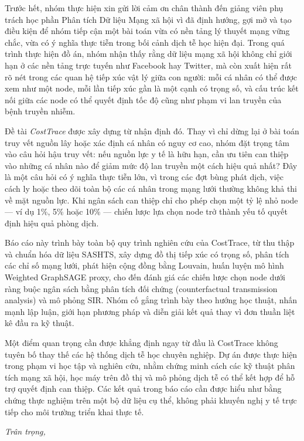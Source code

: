 \documentclass[12pt,a4paper]{report}
\theoremstyle{definition}
\begin{document}
Trước hết, nhóm thực hiện xin gửi lời cảm ơn chân thành đến giảng viên phụ trách học phần Phân tích Dữ liệu Mạng xã hội vì đã định hướng, gợi mở và tạo điều kiện để nhóm tiếp cận một bài toán vừa có nền tảng lý thuyết mạng vững chắc, vừa có ý nghĩa thực tiễn trong bối cảnh dịch tễ học hiện đại. Trong quá trình thực hiện đồ án, nhóm nhận thấy rằng dữ liệu mạng xã hội không chỉ giới hạn ở các nền tảng trực tuyến như Facebook hay Twitter, mà còn xuất hiện rất rõ nét trong các quan hệ tiếp xúc vật lý giữa con người: mỗi cá nhân có thể được xem như một node, mỗi lần tiếp xúc gần là một cạnh có trọng số, và cấu trúc kết nối giữa các node có thể quyết định tốc độ cũng như phạm vi lan truyền của bệnh truyền nhiễm.

Đề tài \textit{CostTrace} được xây dựng từ nhận định đó. Thay vì chỉ dừng lại ở bài toán truy vết nguồn lây hoặc xác định cá nhân có nguy cơ cao, nhóm đặt trọng tâm vào câu hỏi hậu truy vết: nếu nguồn lực y tế là hữu hạn, cần ưu tiên can thiệp vào những cá nhân nào để giảm mức độ lan truyền một cách hiệu quả nhất? Đây là một câu hỏi có ý nghĩa thực tiễn lớn, vì trong các đợt bùng phát dịch, việc cách ly hoặc theo dõi toàn bộ các cá nhân trong mạng lưới thường không khả thi về mặt nguồn lực. Khi ngân sách can thiệp chỉ cho phép chọn một tỷ lệ nhỏ node --- ví dụ 1\%, 5\% hoặc 10\% --- chiến lược lựa chọn node trở thành yếu tố quyết định hiệu quả phòng dịch.

Báo cáo này trình bày toàn bộ quy trình nghiên cứu của CostTrace, từ thu thập và chuẩn hóa dữ liệu SASHTS, xây dựng đồ thị tiếp xúc có trọng số, phân tích các chỉ số mạng lưới, phát hiện cộng đồng bằng Louvain, huấn luyện mô hình Weighted GraphSAGE proxy, cho đến đánh giá các chiến lược chọn node dưới ràng buộc ngân sách bằng phân tích đối chứng (counterfactual transmission analysis) và mô phỏng SIR. Nhóm cố gắng trình bày theo hướng học thuật, nhấn mạnh lập luận, giới hạn phương pháp và diễn giải kết quả thay vì đơn thuần liệt kê đầu ra kỹ thuật.

Một điểm quan trọng cần được khẳng định ngay từ đầu là CostTrace không tuyên bố thay thế các hệ thống dịch tễ học chuyên nghiệp. Dự án được thực hiện trong phạm vi học tập và nghiên cứu, nhằm chứng minh cách các kỹ thuật phân tích mạng xã hội, học máy trên đồ thị và mô phỏng dịch tễ có thể kết hợp để hỗ trợ quyết định can thiệp. Các kết quả trong báo cáo cần được hiểu như bằng chứng thực nghiệm trên một bộ dữ liệu cụ thể, không phải khuyến nghị y tế trực tiếp cho môi trường triển khai thực tế.

\vspace{0.5cm}
\noindent\textit{Trân trọng,}
\end{document}
